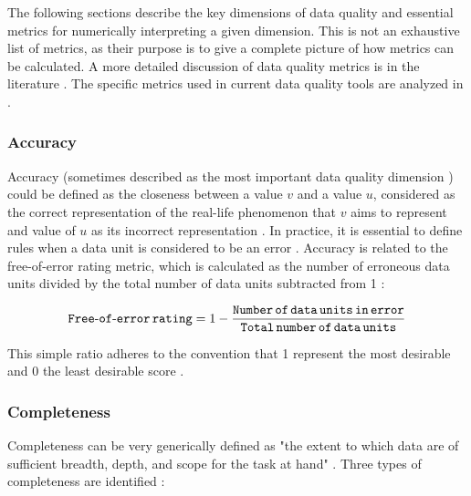 				The following sections describe the key dimensions of data quality and essential metrics for numerically interpreting a given dimension. This is not an exhaustive list of metrics, as their purpose is to give a complete picture of how metrics can be calculated. A more detailed discussion of data quality metrics is in the literature \cite{Pipino2002}\cite{Ehrlinger2019}\cite{McGilvray2008}\cite{Batini2006}. The specific metrics used in current data quality tools are analyzed in \cite{Ehrlinger2019}.		
				
				\subsubsection{Accuracy}
				\label{subsec:accuracy}
				
					Accuracy (sometimes described as the most important data quality dimension \cite{Ehrlinger2019}) could be defined as the closeness between a value $v$ and a value $u$, considered as the correct representation of the real-life phenomenon that $v$ aims to represent and value of $u$ as its incorrect representation \cite{Batini2006}. In practice, it is essential to define rules when a data unit is considered to be an error \cite{Pipino2002}. Accuracy is related to the free-of-error rating metric, which is calculated as the number of erroneous data units divided by the total number of data units subtracted from 1 \cite{Pipino2002}\cite{Ehrlinger2019}: 
						
					\begin{equation}
					\label{eqn:accuracy}
					{\operatorname{\mathtt{Free-of-error}}}\,{\operatorname{\mathtt{rating}}} = 1 - \frac{{\operatorname{\mathtt{Number}}}\,{\operatorname{\mathtt{of}}}\,{\operatorname{\mathtt{data}}}\,{\operatorname{\mathtt{units}}}\,{\operatorname{\mathtt{in}}}\,{\operatorname{\mathtt{error}}}}{{\operatorname{\mathtt{Total}}}\,{\operatorname{\mathtt{number}}}\,{\operatorname{\mathtt{of}}}\,{\operatorname{\mathtt{data}}}\,{\operatorname{\mathtt{units}}}}
					\end{equation} 
			
				This simple ratio adheres to the convention that 1 represent the most desirable and 0 the least desirable score \cite{Pipino2002}.
													
				\subsubsection{Completeness}
				\label{subsec:completeness}
				
					Completeness can be very generically defined as "the extent to which data are of sufficient breadth, depth, and scope for the task at hand" \cite{Batini2006}. Three types of completeness are identified \cite{Batini2006}:
					

